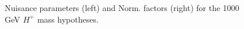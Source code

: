 \begin{figure}[H]
  \centering
  \caption{Nuisance parameters (left) and Norm. factors (right) for the 1000 GeV $H^{+}$ mass hypotheses.}
  \label{fig:Prefit_Hp1000_Blind}
\end{figure}
